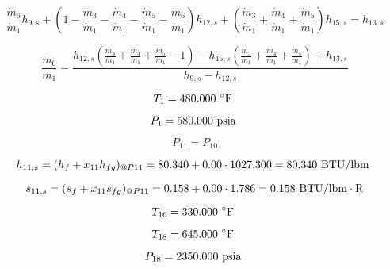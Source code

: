 \documentclass{article}
\begin{document}
\begin{equation}
\frac{\dot{m}_{ 6}}{\dot{m}_{ 1}}h_{ 9,s} + (1 - \frac{\dot{m}_{ 3}}{\dot{m}_{ 1}} - \frac{\dot{m}_{ 4}}{\dot{m}_{ 1}} - \frac{\dot{m}_{ 5}}{\dot{m}_{ 1}} - \frac{\dot{m}_{ 6}}{\dot{m}_{ 1}})h_{12,s} + (\frac{\dot{m}_{ 3}}{\dot{m}_{ 1}} + \frac{\dot{m}_{ 4}}{\dot{m}_{ 1}} + \frac{\dot{m}_{ 5}}{\dot{m}_{ 1}})h_{15,s} = h_{13,s}
\end{equation}

\begin{equation}
\frac{\dot{m}_{ 6}}{\dot{m}_{ 1}} = \frac{h_{12,s}(\frac{\dot{m}_{3}}{\dot{m}_{1}} + \frac{\dot{m}_{4}}{\dot{m}_{1}} + \frac{\dot{m}_{5}}{\dot{m}_{1}} - 1) - h_{15,s}(\frac{\dot{m}_{3}}{\dot{m}_{1}} + \frac{\dot{m}_{4}}{\dot{m}_{1}} + \frac{\dot{m}_{5}}{\dot{m}_{1}}) + h_{13,s}}{h_{9,s} - h_{12,s}}
\end{equation}

\begin{equation}
T_{ 1} =  480.000\textnormal{ \(^{\circ}\)F             }
\end{equation}

\begin{equation}
P_{ 1} =  580.000\textnormal{ psia                      }
\end{equation}

\begin{equation}
P_{11} = P_{10}
\end{equation}

\begin{equation}
  h_{11,s} = (h_{f} + x_{11}h_{fg})_{@P11} =   80.340 + 0.00\cdot1027.300 =   80.340
\textnormal{ BTU/lbm                   }
\end{equation}

\begin{equation}
  s_{11,s} = (s_{f} + x_{11}s_{fg})_{@P11} =    0.158 + 0.00\cdot   1.786 =    0.158
\textnormal{ BTU/lbm}\cdot\textnormal{R}
\end{equation}

\begin{equation}
T_{16} =  330.000\textnormal{ \(^{\circ}\)F             }
\end{equation}

\begin{equation}
T_{18} =  645.000\textnormal{ \(^{\circ}\)F             }
\end{equation}

\begin{equation}
P_{18} = 2350.000\textnormal{ psia                      }
\end{equation}
\end{document}
